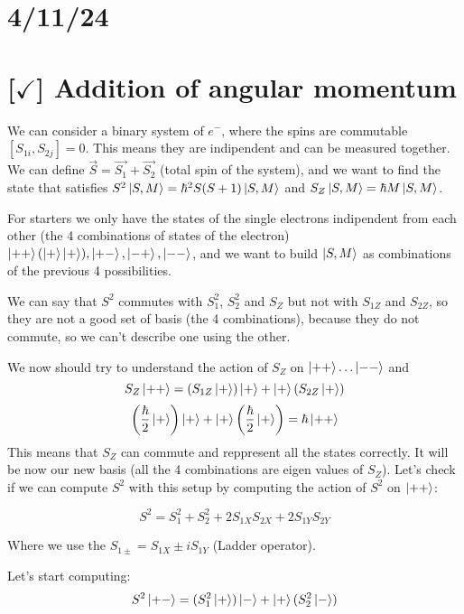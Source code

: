 \section{4/11/24}

\section{[$\checkmark$] Addition of angular momentum}

We can consider a binary system of $e^-$, where the spins are commutable $[S_{1i}, S_{2j}] = 0$. This means they are indipendent and can be measured together. We can define $\vec{S} = \vec{S_1} + \vec{S_2}$ (total spin of the system), and we want to find the state that satisfies $S^2 \ket{S, M} = \hbar^2 S(S+1)\ket{S,M}$ and $S_Z \ket{S, M} = \hbar M \ket{S,M}$.

\vspace{10pt}

\noindent For starters we only have the states of the single electrons indipendent from each other (the 4 combinations of states of the electron) $\ket{++} (\ket{+}\ket{+}), \ket{+-}, \ket{-+}, \ket{--}$, and we want to build $\ket{S, M}$ as combinations of the previous 4 possibilities.

\vspace{10pt}

\noindent We can say that $S^2$ commutes with $S_1^2$, $S_2^2$ and $S_Z$ but not with $S_{1Z}$ and $S_{2Z}$, so they are not a good set of basis (the 4 combinations), because they do not commute, so we can't describe one using the other.

\vspace{10pt}

\noindent We now should try to understand the action of $S_Z$ on $\ket{++} \dots \ket{--}$ and $$S_Z\ket{++} = (S_{1Z}\ket{+})\ket{+} + \ket{+}(S_{2Z} \ket{+})$$ $$\left(\frac{\hbar}{2}\ket{+}\right) \ket{+} + \ket{+} \left(\frac{\hbar}{2} \ket{+}\right) = \hbar\ket{++}$$ 
This means that $S_Z$ can commute and reppresent all the states correctly. It will be now our new basis (all the 4 combinations are eigen values of $S_Z$). Let's check if we can compute $S^2$ with this setup by computing the action of $S^2$ on $\ket{++}$:

$$ S^2 = S_1^2 + S_2^2 + 2S_{1X}S_{2X} + 2S_{1Y}S_{2Y} $$

\noindent Where we use the $S_{1\pm} = S_{1X} \pm iS_{1Y}$ (Ladder operator).

\noindent Let's start computing:
$$ S^2\ket{+-} = (S_1^2\ket{+})\ket{-} + \ket{+}(S_2^2\ket{-}) $$

